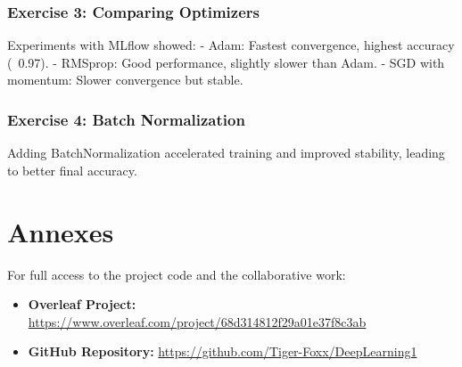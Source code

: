 \documentclass{article}
\begin{document}
\subsubsection{Exercise 3: Comparing Optimizers}
Experiments with MLflow showed:
- Adam: Fastest convergence, highest accuracy (~0.97).
- RMSprop: Good performance, slightly slower than Adam.
- SGD with momentum: Slower convergence but stable.

\subsubsection{Exercise 4: Batch Normalization}
Adding BatchNormalization accelerated training and improved stability, leading to better final accuracy.

\section*{Annexes}

For full access to the project code and the collaborative work:

\begin{itemize}
    \item \textbf{Overleaf Project:} \href{https://www.overleaf.com/project/68d314812f29a01e37f8c3ab}{https://www.overleaf.com/project/68d314812f29a01e37f8c3ab}
    \item \textbf{GitHub Repository:} \href{https://github.com/Tiger-Foxx/DeepLearning1}{https://github.com/Tiger-Foxx/DeepLearning1}
\end{itemize}
\end{document}
